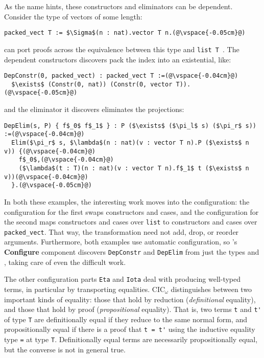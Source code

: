 As the name hints, these constructors and eliminators can be dependent.
Consider the type of vectors of some length:

\begin{lstlisting}
packed_vect T := $\Sigma$(n : nat).vector T n.(@\vspace{-0.05cm}@)
\end{lstlisting}
\toolnamec can port proofs across the equivalence between this type and \lstinline{list T}~\href{https://github.com/uwplse/pumpkin-pi/blob/v2.0.0/plugin/coq/examples/Example.v}{}. %
The dependent constructors \toolnamec discovers pack the index into an existential, like:

\begin{lstlisting}
DepConstr(0, packed_vect) : packed_vect T :=(@\vspace{-0.04cm}@)
  $\exists$ (Constr(0, nat)) (Constr(0, vector T)).(@\vspace{-0.05cm}@)
\end{lstlisting}
and the eliminator it discovers eliminates the projections:

\begin{lstlisting}
DepElim(s, P) { f$_0$ f$_1$ } : P ($\exists$ ($\pi_l$ s) ($\pi_r$ s)) :=(@\vspace{-0.04cm}@)
  Elim($\pi_r$ s, $\lambda$(n : nat)(v : vector T n).P ($\exists$ n v)) {(@\vspace{-0.04cm}@)
    f$_0$,(@\vspace{-0.04cm}@)
    ($\lambda$(t : T)(n : nat)(v : vector T n).f$_1$ t ($\exists$ n v))(@\vspace{-0.04cm}@)
  }.(@\vspace{-0.05cm}@) 
\end{lstlisting}

In both these examples, the interesting work moves into the configuration:
the configuration for the first swaps constructors and cases,
and the configuration for the second maps constructors and cases over \lstinline{list} to constructors and cases over \lstinline{packed_vect}. %
That way, the transformation need not add, drop, or reorder arguments.
Furthermore, both examples use automatic configuration, so \toolnamec's \textbf{Configure} component 
discovers \lstinline{DepConstr} and \lstinline{DepElim} from just the types \Aa and \B, taking care of even the difficult work.

The other configuration parts \lstinline{Eta} and \lstinline{Iota} deal with producing well-typed terms,
in particular by transporting equalities.
CIC$_{\omega}$ distinguishes between two important kinds of equality: those that hold by reduction (\textit{definitional} equality), and those that hold by proof (\textit{propositional} equality).
That is, two terms \lstinline{t} and \lstinline{t'} of type \lstinline{T} are definitionally equal if they reduce to the same normal form,
and propositionally equal if there is a proof that \lstinline{t = t'} using the inductive
equality type \lstinline{=} at type \lstinline{T}. Definitionally equal terms are necessarily propositionally equal, but 
the converse is not in general true.

